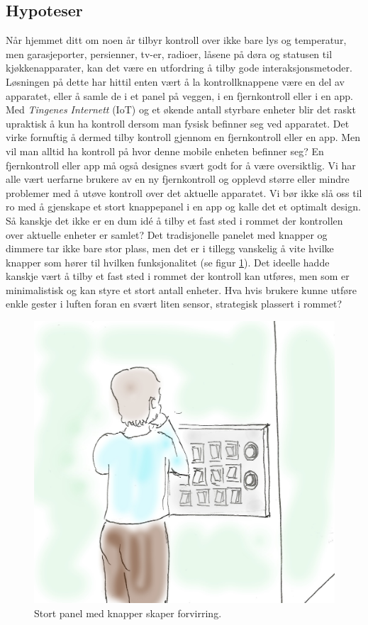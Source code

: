\subsection{Hypoteser}
Når hjemmet ditt om noen år tilbyr kontroll over ikke bare lys og temperatur, men garasjeporter, persienner, tv-er, radioer, låsene på døra og statusen til kjøkkenapparater, kan det være en utfordring å tilby gode interaksjonsmetoder. Løsningen på dette har hittil enten vært å la kontrollknappene være en del av apparatet, eller å samle de i et panel på veggen, i en fjernkontroll eller i en app. Med \emph{Tingenes Internett} (IoT) og et økende antall styrbare enheter blir det raskt upraktisk å kun ha kontroll dersom man fysisk befinner seg ved apparatet. Det virke fornuftig å dermed tilby kontroll gjennom en fjernkontroll eller en app. Men vil man alltid ha kontroll på hvor denne mobile enheten befinner seg? En fjernkontroll eller app må også designes svært godt for å være oversiktlig. Vi har alle vært uerfarne brukere av en ny fjernkontroll og opplevd større eller mindre problemer med å utøve kontroll over det aktuelle apparatet.  Vi bør ikke slå oss til ro med å gjenskape et stort knappepanel i en app og kalle det et optimalt design. Så kanskje det ikke er en dum idé å tilby et fast sted i rommet der kontrollen over aktuelle enheter er samlet? Det tradisjonelle panelet med knapper og dimmere tar ikke bare stor plass, men det er i tillegg vanskelig å vite hvilke knapper som hører til hvilken funksjonalitet (se figur \ref{fig:panel}). Det ideelle hadde kanskje vært å tilby et fast sted i rommet der kontroll kan utføres, men som er minimalistisk og kan styre et stort antall enheter. Hva hvis brukere kunne utføre enkle gester i luften foran en svært liten sensor, strategisk plassert i rommet?\\
\begin{figure}
\centering
\includegraphics[scale=0.2]{fig/confusingbuttons}
\caption{Stort panel med knapper skaper forvirring.}
\label{fig:panel}
\end{figure}\\

